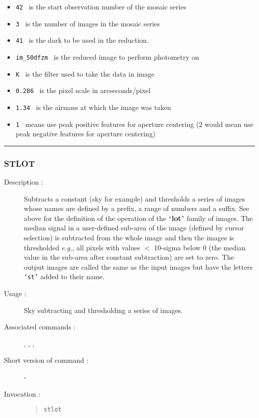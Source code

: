 \begin{description}
\begin{itemize}
\item {\tt 42 } is the start observation number of the mosaic series
\item {\tt 3 } is the number of images in the mosaic series
\item {\tt 41 } is the dark to be used in the reduction.
\item {\tt im\_50dfzm } is the reduced image to perform photometry on
\item {\tt K } is the filter used to take the data in image
\item {\tt 0.286 } is the pixel scale in arcseconds/pixel
\item {\tt 1.34 } is the airmass at which the image was taken
\item {\tt 1 } means use peak positive features for aperture centering
(2 would mean use peak negative features for aperture centering)
\end{itemize}

\end{description}

\hrule
\subsubsection*{\label{STLOT}STLOT}

\begin{description}

\item[Description :] Subtracts a constant (sky for example) and
thresholds a series of images whose names are defined by a prefix, a
range of numbers and a suffix. See above for the definition of the
operation of the ``{\bf lot}'' family of images.  The median signal in
a user-defined sub-area of the image (defined by cursor selection) is
subtracted from the whole image and then the images is thresholded
\emph{e.g.}, all pixels with values $<$ 10-sigma below 0 (the median
value in the sub-area after constant subtraction) are set to zero.  The
output images are called the same as the input images but have the
letters {\tt `st'} added to their name.

\item[Usage :] Sky subtracting and thresholding a series of images.

\item[Associated commands :] {\tt {}},
{\tt {}}, {\tt {}},
{\tt {}}

\item[Short version of command :] -
\item[Invocation :]

\begin{quote}{\tt  stlot }\end{quote}

\end{description}

